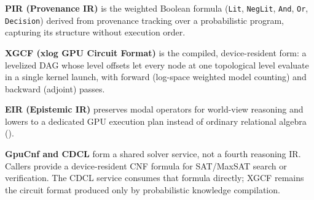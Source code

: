 \textbf{PIR (Provenance IR)} is the weighted Boolean formula (\texttt{Lit}, \texttt{NegLit}, \texttt{And}, \texttt{Or}, \texttt{Decision}) derived from provenance tracking over a probabilistic program, capturing its structure without execution order.

\textbf{XGCF (xlog GPU Circuit Format)} is the compiled, device-resident form: a levelized DAG whose level offsets let every node at one topological level evaluate in a single kernel launch, with forward (log-space weighted model counting) and backward (adjoint) passes.

\textbf{EIR (Epistemic IR)} preserves modal operators for world-view reasoning and lowers to a dedicated GPU execution plan instead of ordinary relational algebra ().

\textbf{GpuCnf and CDCL} form a shared solver service, not a fourth reasoning IR. Callers provide a device-resident CNF formula for SAT/MaxSAT search or verification. The CDCL service consumes that formula directly; XGCF remains the circuit format produced only by probabilistic knowledge compilation.

